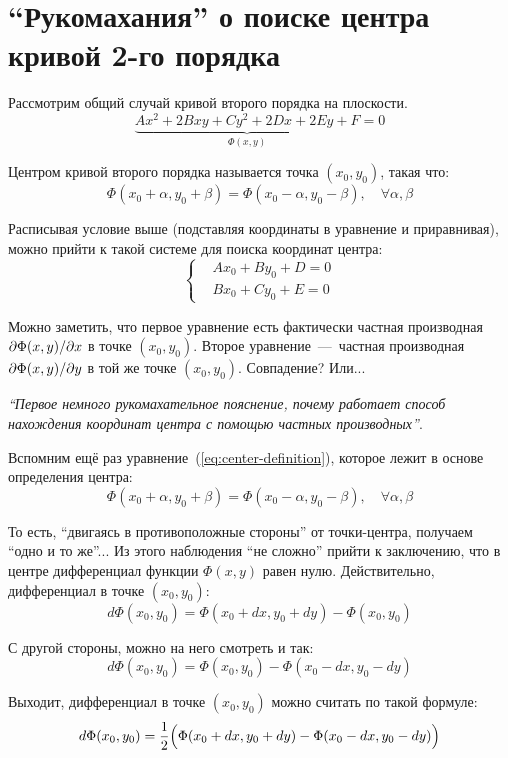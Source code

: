 \documentclass[a4paper,12pt]{article}
\begin{document}
  
  \section{``Рукомахания'' о поиске центра кривой 2-го порядка}
  \label{seq:about-ways}
  
  Рассмотрим общий случай кривой второго порядка на плоскости.
  \[
    \underbrace{Ax^2 + 2Bxy + Cy^2 + 2Dx + 2Ey + F}_{\Phi(x, y)} = 0
  \]
  
  Центром кривой второго порядка называется точка $(x_0, y_0)$, такая что:
  \begin{equation}\label{eq:center-definition}
    \Phi(x_0 + \alpha, y_0 + \beta) = \Phi(x_0 - \alpha, y_0 - \beta),\quad \forall \alpha, \beta
  \end{equation}
  
  Расписывая условие выше (подставляя координаты в уравнение и приравнивая), можно прийти к такой системе для поиска координат центра:
  \[
    \left\{
      \begin{aligned}
        &Ax_0 + By_0 + D = 0\\
        &Bx_0 + Cy_0 + E = 0
      \end{aligned}
    \right.
  \]
  
  Можно заметить, что первое уравнение есть фактически частная производная $\partial \Phi(x, y) \hm/ \partial x$ в точке $(x_0, y_0)$.
  Второе уравнение~---~частная производная $\partial \Phi(x, y) \hm/ \partial y$ в той же точке $(x_0, y_0)$.
  Совпадение?
  Или...
  
  
  \medskip
  \emph{``Первое немного рукомахательное пояснение, почему работает способ нахождения координат центра с помощью частных производных''}.
  
  Вспомним ещё раз уравнение~(\ref{eq:center-definition}), которое лежит в основе определения центра:
  \[
    \Phi(x_0 + \alpha, y_0 + \beta) = \Phi(x_0 - \alpha, y_0 - \beta),\quad \forall \alpha, \beta
  \]
  
  То есть, ``двигаясь в противоположные стороны'' от точки-центра, получаем ``одно и то же''...
  Из этого наблюдения ``не сложно'' прийти к заключению, что в центре дифференциал функции $\Phi(x, y)$ равен нулю.
  Действительно, дифференциал в точке $(x_0, y_0)$:
  \[
    d\Phi(x_0, y_0) = \Phi(x_0 + dx, y_0 + dy) - \Phi(x_0, y_0)
  \]
  
  С другой стороны, можно на него смотреть и так:
  \[
    d\Phi(x_0, y_0) = \Phi(x_0, y_0) - \Phi(x_0 - dx, y_0 - dy)
  \]
  
  Выходит, дифференциал в точке $(x_0, y_0)$ можно считать по такой формуле:
  \[
    d\Phi(x_0, y_0) = \frac{1}{2} \Bigl(\Phi(x_0 + dx, y_0 + dy) - \Phi(x_0 - dx, y_0 - dy)\Bigr)
  \]
  
\end{document}

